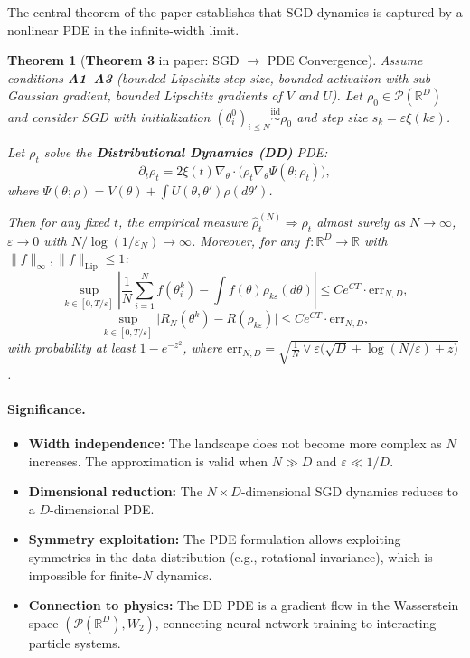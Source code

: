 \documentclass[11pt]{article}
\newcommand{\R}{\mathbb{R}}
\newtheorem{theorem}{Theorem}
\begin{document}
The central theorem of the paper establishes that SGD dynamics is captured by a nonlinear PDE in the infinite-width limit.

\begin{theorem}[\textbf{Theorem 3} in paper: SGD $\to$ PDE Convergence]
\label{thm:main}
Assume conditions \textbf{A1--A3} (bounded Lipschitz step size, bounded activation with sub-Gaussian gradient, bounded Lipschitz gradients of $V$ and $U$). Let $\rho_0 \in \mathcal{P}(\R^D)$ and consider SGD with initialization $(\theta_i^0)_{i \leq N} \overset{\text{iid}}{\sim} \rho_0$ and step size $s_k = \varepsilon \xi(k\varepsilon)$.

Let $\rho_t$ solve the \textbf{Distributional Dynamics (DD)} PDE:
\begin{equation}
\partial_t \rho_t = 2\xi(t) \nabla_\theta \cdot \bigl( \rho_t \nabla_\theta \Psi(\theta; \rho_t) \bigr),
\end{equation}
where $\Psi(\theta; \rho) = V(\theta) + \int U(\theta, \theta') \rho(d\theta')$.

Then for any fixed $t$, the empirical measure $\hat{\rho}^{(N)}_t \Rightarrow \rho_t$ almost surely as $N \to \infty$, $\varepsilon \to 0$ with $N / \log(1/\varepsilon_N) \to \infty$. Moreover, for any $f: \R^D \to \R$ with $\|f\|_\infty, \|f\|_{\text{Lip}} \leq 1$:
\begin{equation}
\sup_{k \in [0, T/\varepsilon]} \left| \frac{1}{N} \sum_{i=1}^N f(\theta_i^k) - \int f(\theta) \rho_{k\varepsilon}(d\theta) \right| \leq C e^{CT} \cdot \text{err}_{N,D},
\end{equation}
\begin{equation}
\sup_{k \in [0, T/\varepsilon]} \bigl| R_N(\theta^k) - R(\rho_{k\varepsilon}) \bigr| \leq C e^{CT} \cdot \text{err}_{N,D},
\end{equation}
with probability at least $1 - e^{-z^2}$, where $\text{err}_{N,D} = \sqrt{\frac{1}{N} \vee \varepsilon \bigl(\sqrt{D} + \log(N/\varepsilon) + z\bigr)}$.
\end{theorem}

\paragraph{Significance.}
\begin{itemize}
\item \textbf{Width independence:} The landscape does not become more complex as $N$ increases. The approximation is valid when $N \gg D$ and $\varepsilon \ll 1/D$.
\item \textbf{Dimensional reduction:} The $N \times D$-dimensional SGD dynamics reduces to a $D$-dimensional PDE.
\item \textbf{Symmetry exploitation:} The PDE formulation allows exploiting symmetries in the data distribution (e.g., rotational invariance), which is impossible for finite-$N$ dynamics.
\item \textbf{Connection to physics:} The DD PDE is a gradient flow in the Wasserstein space $(\mathcal{P}(\R^D), W_2)$, connecting neural network training to interacting particle systems.
\end{itemize}
\end{document}
